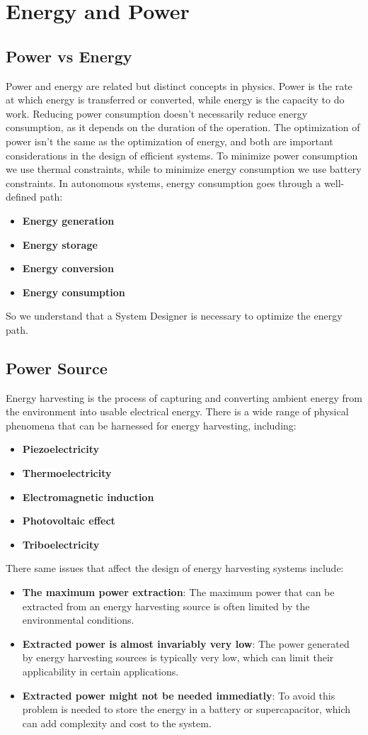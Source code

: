 \section{Energy and Power}
\subsection{Power vs Energy}
Power and energy are related but distinct concepts in physics. 
Power is the rate at which energy is transferred or converted, while energy is the capacity to do work.
Reducing power consumption doesn't necessarily reduce energy consumption, as it depends on the duration of the operation. 
The optimization of power isn't the same as the optimization of energy, and both are important considerations in the design of efficient systems.
To minimize power consumption we use thermal constraints, while to minimize energy consumption we use battery constraints.
In autonomous systems, energy consumption goes through a well-defined path:
\begin{itemize}
    \item \textbf{Energy generation}
    \item \textbf{Energy storage}
    \item \textbf{Energy conversion}
    \item \textbf{Energy consumption}
\end{itemize}
So we understand that a System Designer is necessary to optimize the energy path.
\subsection{Power Source}
Energy harvesting is the process of capturing and converting ambient energy from the environment into usable electrical energy.
There is a wide range of physical phenomena that can be harnessed for energy harvesting, including:
\begin{itemize}
    \item \textbf{Piezoelectricity}
    \item \textbf{Thermoelectricity}
    \item \textbf{Electromagnetic induction}
    \item \textbf{Photovoltaic effect}
    \item \textbf{Triboelectricity}
\end{itemize}
There same issues that affect the design of energy harvesting systems include:
\begin{itemize}
    \item \textbf{The maximum power extraction}: The maximum power that can be extracted from an energy harvesting source is often limited by the environmental conditions.
    \item \textbf{Extracted power is almost invariably very low}: The power generated by energy harvesting sources is typically very low, which can limit their applicability in certain applications.
    \item \textbf{Extracted power might not be needed immediatly}: To avoid this problem is needed to store the energy in a battery or supercapacitor, which can add complexity and cost to the system.
\end{itemize}
